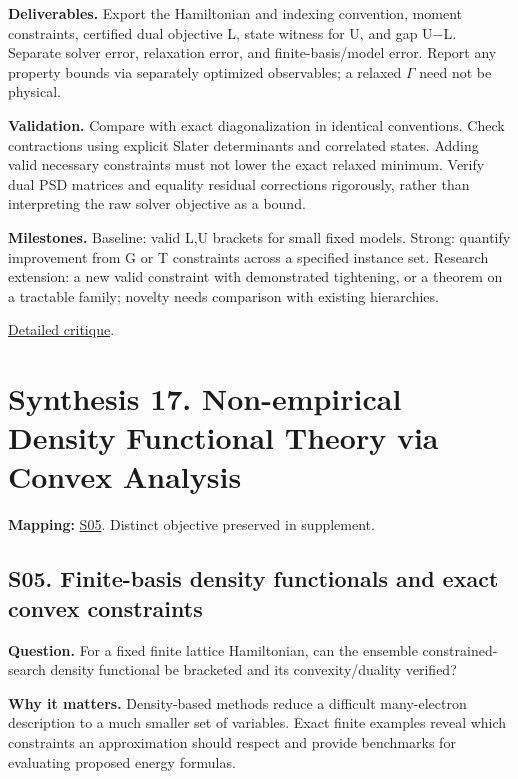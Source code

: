 \documentclass[
  11pt,
]{article}
\begin{document}
\textbf{Deliverables.} Export the Hamiltonian and indexing convention,
moment constraints, certified dual objective L, state witness for U, and
gap U\ensuremath{-}L. Separate solver error, relaxation error, and
finite-basis/model error. Report any property bounds via separately
optimized observables; a relaxed \ensuremath{\Gamma} need not be
physical.

\textbf{Validation.} Compare with exact diagonalization in identical
conventions. Check contractions using explicit Slater determinants and
correlated states. Adding valid necessary constraints must not lower the
exact relaxed minimum. Verify dual PSD matrices and equality residual
corrections rigorously, rather than interpreting the raw solver
objective as a bound.

\textbf{Milestones.} Baseline: valid L,U brackets for small fixed
models. Strong: quantify improvement from G or T constraints across a
specified instance set. Research extension: a new valid constraint with
demonstrated tightening, or a theorem on a tractable family; novelty
needs comparison with existing hierarchies.

\href{https://github.com/rick-stevens-ai/Pure-Thought/blob/main/reviews/16-N-Representability-2RDM.md}{Detailed
critique}.

\section{Synthesis 17. Non-empirical Density Functional Theory via
Convex Analysis}

\textbf{Mapping:}
\href{https://github.com/rick-stevens-ai/Pure-Thought/blob/main/supplemental/S05.md}{S05}.
Distinct objective preserved in supplement.

\subsection{S05. Finite-basis density functionals and exact convex
constraints}

\textbf{Question.} For a fixed finite lattice Hamiltonian, can the
ensemble constrained-search density functional be bracketed and its
convexity/duality verified?

\textbf{Why it matters.} Density-based methods reduce a difficult
many-electron description to a much smaller set of variables. Exact
finite examples reveal which constraints an approximation should respect
and provide benchmarks for evaluating proposed energy formulas.
\end{document}

